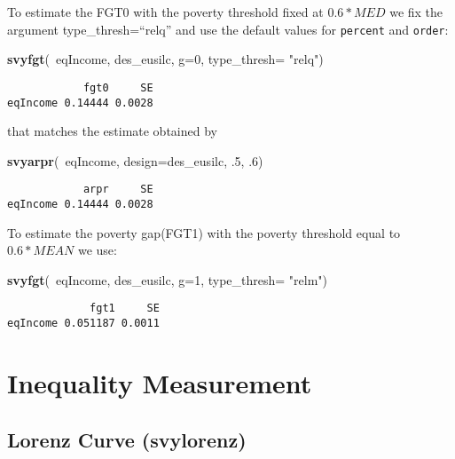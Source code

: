 \documentclass[]{book}
\newenvironment{Shaded}{\begin{snugshade}}{\end{snugshade}}
\newcommand{\KeywordTok}[1]{\textcolor[rgb]{0.13,0.29,0.53}{\textbf{{#1}}}}
\newcommand{\DataTypeTok}[1]{\textcolor[rgb]{0.13,0.29,0.53}{{#1}}}
\newcommand{\DecValTok}[1]{\textcolor[rgb]{0.00,0.00,0.81}{{#1}}}
\newcommand{\StringTok}[1]{\textcolor[rgb]{0.31,0.60,0.02}{{#1}}}
\newcommand{\NormalTok}[1]{{#1}}
\begin{document}
To estimate the FGT0 with the poverty threshold fixed at \(0.6* MED\) we
fix the argument type\_thresh=``relq'' and use the default values for
\texttt{percent} and \texttt{order}:

\begin{Shaded}
\begin{Highlighting}[]
\KeywordTok{svyfgt}\NormalTok{(~eqIncome, des_eusilc, }\DataTypeTok{g=}\DecValTok{0}\NormalTok{, }\DataTypeTok{type_thresh=} \StringTok{"relq"}\NormalTok{)}
\end{Highlighting}
\end{Shaded}

\begin{verbatim}
            fgt0     SE
eqIncome 0.14444 0.0028
\end{verbatim}

that matches the estimate obtained by

\begin{Shaded}
\begin{Highlighting}[]
\KeywordTok{svyarpr}\NormalTok{(~eqIncome, }\DataTypeTok{design=}\NormalTok{des_eusilc, .}\DecValTok{5}\NormalTok{, .}\DecValTok{6}\NormalTok{)}
\end{Highlighting}
\end{Shaded}

\begin{verbatim}
            arpr     SE
eqIncome 0.14444 0.0028
\end{verbatim}

To estimate the poverty gap(FGT1) with the poverty threshold equal to
\(0.6*MEAN\) we use:

\begin{Shaded}
\begin{Highlighting}[]
\KeywordTok{svyfgt}\NormalTok{(~eqIncome, des_eusilc, }\DataTypeTok{g=}\DecValTok{1}\NormalTok{, }\DataTypeTok{type_thresh=} \StringTok{"relm"}\NormalTok{)}
\end{Highlighting}
\end{Shaded}

\begin{verbatim}
             fgt1     SE
eqIncome 0.051187 0.0011
\end{verbatim}

\chapter{Inequality Measurement}\label{inequality}

\section{Lorenz Curve (svylorenz)}\label{lorenz-curve-svylorenz}
\end{document}

